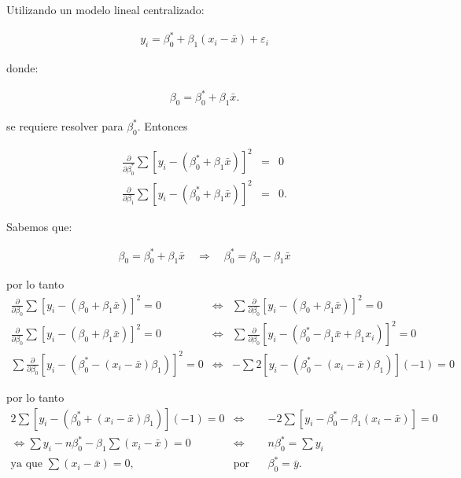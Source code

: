 \documentclass[12pt]{article}
\begin{document}
Utilizando un modelo lineal centralizado:

\begin{eqnarray*}
y_i = \beta_0^* + \beta_1 (x_i - \bar{x}) + \varepsilon_i
\end{eqnarray*}

donde:

\begin{eqnarray*}
\beta_0 = \beta_0^* + \beta_1 \bar{x}.
\end{eqnarray*}

se requiere resolver para $\beta_0^*$. Entonces

\begin{eqnarray*}
\frac{\partial}{\partial \beta_0^*} \sum \left[ y_i - (\beta_0^* + \beta_1 \bar{x}) \right]^2 &=& 0\\
\frac{\partial}{\partial \beta_1} \sum \left[ y_i - (\beta_0^* + \beta_1 \bar{x}) \right]^2&=& 0.
\end{eqnarray*}

Sabemos que:

\begin{eqnarray*}
\beta_0 = \beta_0^* + \beta_1 \bar{x} \quad \Rightarrow \quad \beta_0^* = \beta_0 - \beta_1 \bar{x}
\end{eqnarray*}

por lo tanto
\begin{eqnarray*}
\frac{\partial}{\partial \beta_0} \sum \left[ y_i - \left( \beta_0 + \beta_1 \bar{x} \right) \right]^2 =0
&\Leftrightarrow& \sum \frac{\partial}{\partial \beta_0} \left[ y_i - (\beta_0 + \beta_1 \bar{x}) \right]^2 = 0\\
\frac{\partial}{\partial \beta_0} \sum \left[ y_i - (\beta_0 + \beta_1 \bar{x}) \right]^2 = 0&\Leftrightarrow& \sum \frac{\partial}{\partial \beta_0} \left[ y_i - \left( \beta_0^* - \beta_1 \bar{x} + \beta_1 x_i \right) \right]^2 = 0\\
\sum \frac{\partial}{\partial \beta_0} \left[ y_i - \left( \beta_0^* - (x_i - \bar{x}) \beta_1 \right) \right]^2 = 0&\Leftrightarrow& - \sum 2 \left[ y_i - \left( \beta_0^* - (x_i - \bar{x}) \beta_1 \right) \right](-1) = 0
\end{eqnarray*}

por lo tanto
\begin{eqnarray*}
2 \sum \left[ y_i - \left( \beta_0^* + (x_i - \bar{x}) \beta_1 \right) \right] (-1) = 0&\Leftrightarrow&
-2 \sum \left[ y_i - \beta_0^* - \beta_1 (x_i - \bar{x}) \right] = 0\\
\Leftrightarrow \sum y_i - n \beta_0^* - \beta_1 \sum (x_i - \bar{x}) = 0
&\Leftrightarrow& n \beta_0^* = \sum y_i \\
\textrm{ya que } \sum (x_i - \bar{x}) = 0,
&\textrm{por lo tanto}&\beta_0^* = \bar{y}.
\end{eqnarray*}
\end{document}
